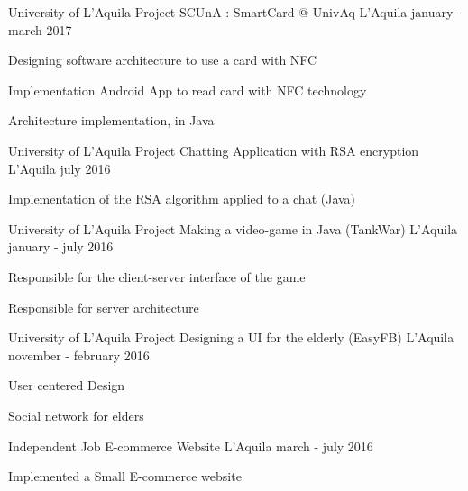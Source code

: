 \begin{cventries}
\cventry
{University of L'Aquila Project} %
{SCUnA : SmartCard @ UnivAq} %
{L'Aquila} %
{january - march 2017} %
{ %
	\begin{cvitems}
		\item {Designing software architecture to use a card with NFC}
		\item {Implementation Android App to read card with NFC technology}
		\item {Architecture implementation, in Java}
	\end{cvitems}
}

\cventry
{University of L'Aquila Project} %
{Chatting Application with RSA encryption} %
{L'Aquila} %
{july 2016} %
{ %
	\begin{cvitems}
		\item {Implementation of the RSA algorithm applied to a chat (Java)}
	\end{cvitems}
}

\cventry
{University of L'Aquila Project} %
{Making a video-game in Java (TankWar)} %
{L'Aquila} %
{january - july 2016} %
{ %
	\begin{cvitems}
		\item {Responsible for the client-server interface of the game}
		\item {Responsible for server architecture}
	\end{cvitems}
}

\cventry
{University of L'Aquila Project} %
{Designing a UI for the elderly (EasyFB)} %
{L'Aquila} %
{november - february 2016} %
{ %
	\begin{cvitems}
		\item {User centered Design}
		\item {Social network for elders}
	\end{cvitems}
}

\cventry
{Independent Job} %
{E-commerce Website} %
{L'Aquila} %
{march - july 2016} %
{ %
\begin{cvitems}
\item {Implemented a Small E-commerce website}
\end{cvitems}
}


\end{cventries}
